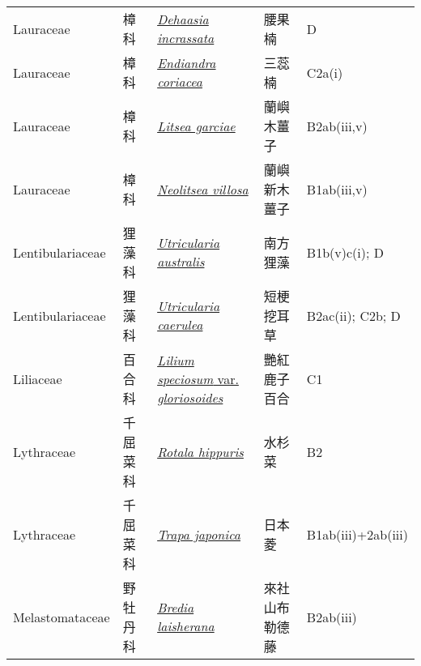 {\begin{longtable}{p{2.5cm}p{2.5cm}p{4.5cm}p{2.5cm}p{3cm}}
    Lauraceae & 樟科 & \href{http://www.theplantlist.org/tpl1.1/search?q=Dehaasia+incrassata}{\textit{Dehaasia incrassata} } & 腰果楠 & D \index{Dehaasia@\textit{Dehaasia}!incrassata@\textit{incrassata}}  \index{腰果楠} \\
    Lauraceae & 樟科 & \href{http://www.theplantlist.org/tpl1.1/search?q=Endiandra+coriacea}{\textit{Endiandra coriacea} } & 三蕊楠 & C2a(i) \index{Endiandra@\textit{Endiandra}!coriacea@\textit{coriacea}}  \index{三蕊楠} \\
    Lauraceae & 樟科 & \href{http://www.theplantlist.org/tpl1.1/search?q=Litsea+garciae}{\textit{Litsea garciae} } & 蘭嶼木薑子 & B2ab(iii,v) \index{Litsea@\textit{Litsea}!garciae@\textit{garciae}}  \index{蘭嶼木薑子} \\
    Lauraceae & 樟科 & \href{http://www.theplantlist.org/tpl1.1/search?q=Neolitsea+villosa}{\textit{Neolitsea villosa} } & 蘭嶼新木薑子 & B1ab(iii,v) \index{Neolitsea@\textit{Neolitsea}!villosa@\textit{villosa}}  \index{蘭嶼新木薑子} \\
    Lentibulariaceae & 狸藻科 & \href{http://www.theplantlist.org/tpl1.1/search?q=Utricularia+australis}{\textit{Utricularia australis} } & 南方狸藻 & B1b(v)c(i); D \index{Utricularia@\textit{Utricularia}!australis@\textit{australis}}  \index{南方狸藻} \\
    Lentibulariaceae & 狸藻科 & \href{http://www.theplantlist.org/tpl1.1/search?q=Utricularia+caerulea}{\textit{Utricularia caerulea} } & 短梗挖耳草 & B2ac(ii); C2b; D \index{Utricularia@\textit{Utricularia}!caerulea@\textit{caerulea}}  \index{短梗挖耳草} \\
    Liliaceae & 百合科 & \href{http://www.theplantlist.org/tpl1.1/search?q=Lilium+speciosum+var.+gloriosoides}{\textit{Lilium speciosum} var. \textit{gloriosoides} } & 艷紅鹿子百合 & C1 \index{Lilium@\textit{Lilium}!speciosum@\textit{speciosum}!var. gloriosoides@var. \textit{gloriosoides}}  \index{艷紅鹿子百合} \\
    Lythraceae & 千屈菜科 & \href{http://www.theplantlist.org/tpl1.1/search?q=Rotala+hippuris}{\textit{Rotala hippuris} } & 水杉菜 & B2 \index{Rotala@\textit{Rotala}!hippuris@\textit{hippuris}}  \index{水杉菜} \\
    Lythraceae & 千屈菜科 & \href{http://www.theplantlist.org/tpl1.1/search?q=Trapa+japonica}{\textit{Trapa japonica} } & 日本菱 & B1ab(iii)+2ab(iii) \index{Trapa@\textit{Trapa}!japonica@\textit{japonica}}  \index{日本菱} \\
    Melastomataceae & 野牡丹科 & \href{http://www.theplantlist.org/tpl1.1/search?q=Bredia+laisherana}{\textit{Bredia laisherana} } & 來社山布勒德藤 & B2ab(iii) \index{Bredia@\textit{Bredia}!laisherana@\textit{laisherana}}  \index{來社山布勒德藤} \\

\end{longtable}}
